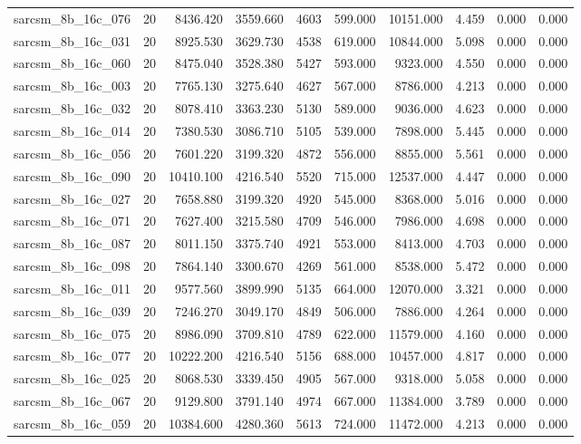 \begin{tabular}{lrrrrrrrrr}
sarcsm\_8b\_16c\_076 & 20 & 8436.420 & 3559.660 & 4603 & 599.000 & 10151.000 & 4.459 & 0.000 & 0.000 \\
sarcsm\_8b\_16c\_031 & 20 & 8925.530 & 3629.730 & 4538 & 619.000 & 10844.000 & 5.098 & 0.000 & 0.000 \\
sarcsm\_8b\_16c\_060 & 20 & 8475.040 & 3528.380 & 5427 & 593.000 & 9323.000 & 4.550 & 0.000 & 0.000 \\
sarcsm\_8b\_16c\_003 & 20 & 7765.130 & 3275.640 & 4627 & 567.000 & 8786.000 & 4.213 & 0.000 & 0.000 \\
sarcsm\_8b\_16c\_032 & 20 & 8078.410 & 3363.230 & 5130 & 589.000 & 9036.000 & 4.623 & 0.000 & 0.000 \\
sarcsm\_8b\_16c\_014 & 20 & 7380.530 & 3086.710 & 5105 & 539.000 & 7898.000 & 5.445 & 0.000 & 0.000 \\
sarcsm\_8b\_16c\_056 & 20 & 7601.220 & 3199.320 & 4872 & 556.000 & 8855.000 & 5.561 & 0.000 & 0.000 \\
sarcsm\_8b\_16c\_090 & 20 & 10410.100 & 4216.540 & 5520 & 715.000 & 12537.000 & 4.447 & 0.000 & 0.000 \\
sarcsm\_8b\_16c\_027 & 20 & 7658.880 & 3199.320 & 4920 & 545.000 & 8368.000 & 5.016 & 0.000 & 0.000 \\
sarcsm\_8b\_16c\_071 & 20 & 7627.400 & 3215.580 & 4709 & 546.000 & 7986.000 & 4.698 & 0.000 & 0.000 \\
sarcsm\_8b\_16c\_087 & 20 & 8011.150 & 3375.740 & 4921 & 553.000 & 8413.000 & 4.703 & 0.000 & 0.000 \\
sarcsm\_8b\_16c\_098 & 20 & 7864.140 & 3300.670 & 4269 & 561.000 & 8538.000 & 5.472 & 0.000 & 0.000 \\
sarcsm\_8b\_16c\_011 & 20 & 9577.560 & 3899.990 & 5135 & 664.000 & 12070.000 & 3.321 & 0.000 & 0.000 \\
sarcsm\_8b\_16c\_039 & 20 & 7246.270 & 3049.170 & 4849 & 506.000 & 7886.000 & 4.264 & 0.000 & 0.000 \\
sarcsm\_8b\_16c\_075 & 20 & 8986.090 & 3709.810 & 4789 & 622.000 & 11579.000 & 4.160 & 0.000 & 0.000 \\
sarcsm\_8b\_16c\_077 & 20 & 10222.200 & 4216.540 & 5156 & 688.000 & 10457.000 & 4.817 & 0.000 & 0.000 \\
sarcsm\_8b\_16c\_025 & 20 & 8068.530 & 3339.450 & 4905 & 567.000 & 9318.000 & 5.058 & 0.000 & 0.000 \\
sarcsm\_8b\_16c\_067 & 20 & 9129.800 & 3791.140 & 4974 & 667.000 & 11384.000 & 3.789 & 0.000 & 0.000 \\
sarcsm\_8b\_16c\_059 & 20 & 10384.600 & 4280.360 & 5613 & 724.000 & 11472.000 & 4.213 & 0.000 & 0.000 \\

\end{tabular}
